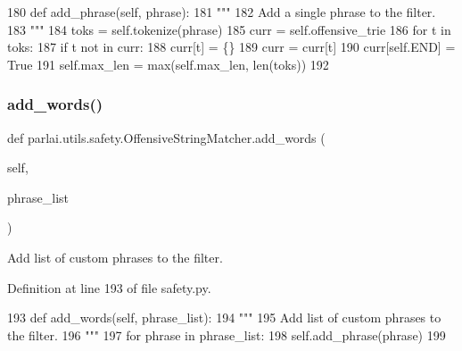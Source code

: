 \begin{DoxyCode}
180     \textcolor{keyword}{def }add\_phrase(self, phrase):
181         \textcolor{stringliteral}{"""}
182 \textcolor{stringliteral}{        Add a single phrase to the filter.}
183 \textcolor{stringliteral}{        """}
184         toks = self.tokenize(phrase)
185         curr = self.offensive\_trie
186         \textcolor{keywordflow}{for} t \textcolor{keywordflow}{in} toks:
187             \textcolor{keywordflow}{if} t \textcolor{keywordflow}{not} \textcolor{keywordflow}{in} curr:
188                 curr[t] = \{\}
189             curr = curr[t]
190         curr[self.END] = \textcolor{keyword}{True}
191         self.max\_len = max(self.max\_len, len(toks))
192 
\end{DoxyCode}
\mbox{\label{classparlai_1_1utils_1_1safety_1_1OffensiveStringMatcher_ab5ca96a02141190f747b03b761f18f98}} 
\subsubsection{\texorpdfstring{add\+\_\+words()}{add\_words()}}
{\footnotesize\ttfamily def parlai.\+utils.\+safety.\+Offensive\+String\+Matcher.\+add\+\_\+words (\begin{DoxyParamCaption}\item[{}]{self,  }\item[{}]{phrase\+\_\+list }\end{DoxyParamCaption})}

\begin{DoxyVerb}Add list of custom phrases to the filter.
\end{DoxyVerb}
 

Definition at line 193 of file safety.\+py.


\begin{DoxyCode}
193     \textcolor{keyword}{def }add\_words(self, phrase\_list):
194         \textcolor{stringliteral}{"""}
195 \textcolor{stringliteral}{        Add list of custom phrases to the filter.}
196 \textcolor{stringliteral}{        """}
197         \textcolor{keywordflow}{for} phrase \textcolor{keywordflow}{in} phrase\_list:
198             self.add\_phrase(phrase)
199 
\end{DoxyCode}
\mbox{\label{classparlai_1_1utils_1_1safety_1_1OffensiveStringMatcher_a926609d00716d64848b3b98079bd1d30}} 
